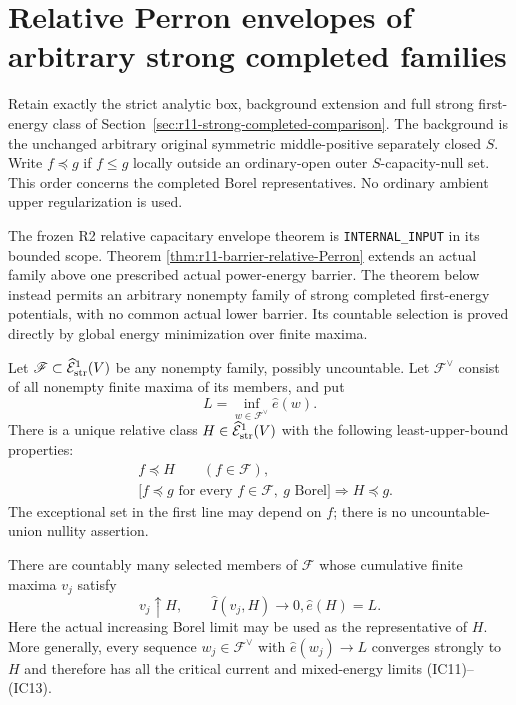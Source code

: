 \section{Relative Perron envelopes of arbitrary strong completed families}
\label{sec:r11-strong-completed-Perron}

Retain exactly the strict analytic box, background extension
and full strong first-energy class of
Section~\ref{sec:r11-strong-completed-comparison}.
The background is the unchanged arbitrary original symmetric
middle-positive separately closed $S$.
Write $f\preceq g$ if $f\leq g$ locally outside an
ordinary-open outer $S$-capacity-null set. This order concerns
the completed Borel representatives. No ordinary ambient
upper regularization is used.

The frozen R2 relative capacitary envelope theorem is
\texttt{INTERNAL\_INPUT} in its bounded scope. Theorem
\ref{thm:r11-barrier-relative-Perron} extends an actual family
above one prescribed actual power-energy barrier. The theorem
below instead permits an arbitrary nonempty family of strong
completed first-energy potentials, with no common actual lower
barrier. Its countable selection is proved directly by global
energy minimization over finite maxima.

\begin{theorem}
\label{thm:r11-strong-completed-Perron}
Let $\mathscr F\subset\widehat{\mathcal E}^1_{\rm str}(V)$
be any nonempty family, possibly uncountable. Let
$\mathscr F^\vee$ consist of all nonempty finite maxima of
its members, and put
\[
                    L=\inf_{w\in\mathscr F^\vee}\widehat e(w).
 \tag{SE1}
\]
There is a unique relative class
$H\in\widehat{\mathcal E}^1_{\rm str}(V)$ with the following
least-upper-bound properties:
\[
 \begin{split}
 &f\preceq H\qquad(f\in\mathscr F),\\
 &\bigl[f\preceq g\text{ for every }f\in\mathscr F,
                      \ g\text{ Borel}\bigr]
                                      \Longrightarrow H\preceq g.
 \end{split}
 \tag{SE2}
\]
The exceptional set in the first line may depend on $f$;
there is no uncountable-union nullity assertion.

There are countably many selected members of $\mathscr F$
whose cumulative finite maxima $v_j$ satisfy
\[
                  v_j\uparrow H,\qquad
                  \widehat I(v_j,H)\longrightarrow0,
                  \widehat e(H)=L.
 \tag{SE3}
\]
Here the actual increasing Borel limit may be used as the
representative of $H$. More generally, every sequence
$w_j\in\mathscr F^\vee$ with $\widehat e(w_j)\to L$
converges strongly to $H$ and therefore has all the critical
current and mixed-energy limits (IC11)--(IC13).
\end{theorem}

